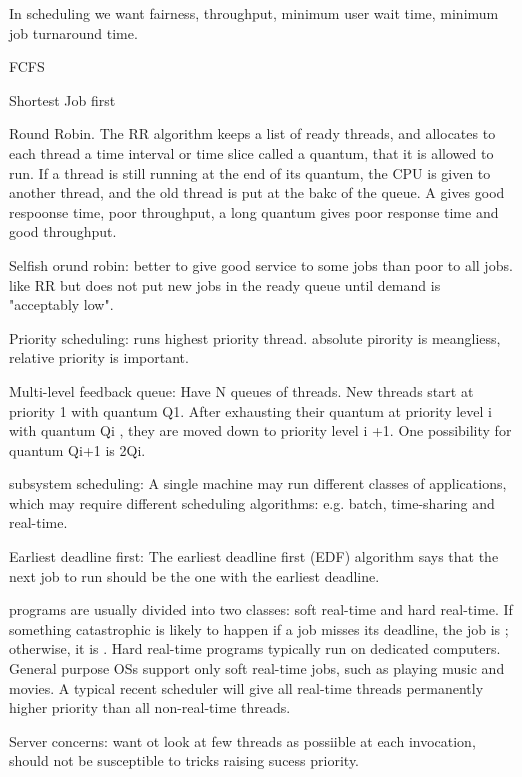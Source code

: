 \begin{compactitem}
\begin{compactitem}
In scheduling we want fairness, throughput, minimum user wait time, minimum job turnaround time.
\begin{compactitem}
\item FCFS
\item Shortest Job first
\item Round Robin. The RR algorithm keeps a list of ready threads, and allocates to each thread a time interval or time slice called a quantum, that it is allowed to run. If a thread is still running at the end of its quantum, the CPU is given to another thread, and the old thread is put at the bakc of the queue. A  gives good respoonse time, poor throughput, a long quantum gives poor response time and good throughput.
\item Selfish orund robin: better to give good service to some jobs than poor to all jobs. like RR but does not put new jobs in the ready queue until demand is "acceptably low".
\item Priority scheduling: runs highest priority thread. absolute pirority is meangliess, relative priority is important.
\item Multi-level feedback queue: Have N queues of threads. New threads start at priority 1 with quantum Q1. After exhausting their quantum at priority level i with quantum Qi , they
are moved down to priority level i +1. One possibility for quantum Qi+1 is
2Qi.
\item subsystem scheduling: A single machine may run different classes of applications, which may
require different scheduling algorithms: e.g. batch, time-sharing and
real-time.
\item Earliest deadline first: The earliest deadline first (EDF) algorithm says that the next job to run
should be the one with the earliest deadline.

 programs are usually divided into two classes: soft real-time and
hard real-time.
If something catastrophic is likely to happen if a job misses its deadline,
the job is ; otherwise, it is .
Hard real-time programs typically run on dedicated computers.
General purpose OSs support only soft real-time jobs, such as playing
music and movies. A typical recent scheduler will give all real-time threads permanently
higher priority than all non-real-time threads.

Server concerns: want ot look at few threads as possiible at each invocation, should not be susceptible to tricks raising sucess priority.


\end{compactitem}
\end{compactitem}
\end{compactitem}
